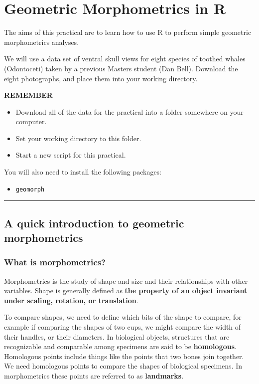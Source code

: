 \documentclass[]{book}
\providecommand{\tightlist}{%
  \setlength{\itemsep}{0pt}\setlength{\parskip}{0pt}}
\theoremstyle{definition}
\theoremstyle{definition}
\theoremstyle{definition}
\theoremstyle{remark}
\begin{document}
\chapter{Geometric Morphometrics in
R}\label{geometric-morphometrics-in-r}

The aims of this practical are to learn how to use R to perform simple
geometric morphometrics analyses.

We will use a data set of ventral skull views for eight species of
toothed whales (Odontoceti) taken by a previous Masters student (Dan
Bell). Download the eight photographs, and place them into your working
directory.

\textbf{REMEMBER}

\begin{itemize}
\tightlist
\item
  Download all of the data for the practical into a folder somewhere on
  your computer.
\item
  Set your working directory to this folder.
\item
  Start a new script for this practical.
\end{itemize}

You will also need to install the following packages:

\begin{itemize}
\tightlist
\item
  \texttt{geomorph}
\end{itemize}

\begin{center}\rule{0.5\linewidth}{\linethickness}\end{center}

\section{A quick introduction to geometric
morphometrics}\label{a-quick-introduction-to-geometric-morphometrics}

\subsection{What is morphometrics?}\label{what-is-morphometrics}

Morphometrics is the study of shape and size and their relationships
with other variables. Shape is generally defined as \textbf{the property
of an object invariant under scaling, rotation, or translation}.

To compare shapes, we need to define which bits of the shape to compare,
for example if comparing the shapes of two cups, we might compare the
width of their handles, or their diameters. In biological objects,
structures that are recognizable and comparable among specimens are said
to be \textbf{homologous}. Homologous points include things like the
points that two bones join together. We need homologous points to
compare the shapes of biological specimens. In morphometrics these
points are referred to as \textbf{landmarks}.
\end{document}
